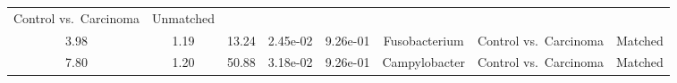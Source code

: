 \documentclass[12pt,]{article}
\begin{document}
\begin{longtable}[]{@{}cccccccc@{}}
\begin{minipage}[t]{0.14\columnwidth}
Control vs.~Carcinoma\strut
\end{minipage} & \begin{minipage}[t]{0.09\columnwidth}\centering\strut
Unmatched\strut
\end{minipage}\tabularnewline
\begin{minipage}[t]{0.05\columnwidth}\centering\strut
3.98\strut
\end{minipage} & \begin{minipage}[t]{0.09\columnwidth}\centering\strut
1.19\strut
\end{minipage} & \begin{minipage}[t]{0.09\columnwidth}\centering\strut
13.24\strut
\end{minipage} & \begin{minipage}[t]{0.07\columnwidth}\centering\strut
2.45e-02\strut
\end{minipage} & \begin{minipage}[t]{0.07\columnwidth}\centering\strut
9.26e-01\strut
\end{minipage} & \begin{minipage}[t]{0.20\columnwidth}\centering\strut
Fusobacterium\strut
\end{minipage} & \begin{minipage}[t]{0.14\columnwidth}\centering\strut
Control vs.~Carcinoma\strut
\end{minipage} & \begin{minipage}[t]{0.09\columnwidth}\centering\strut
Matched\strut
\end{minipage}\tabularnewline
\begin{minipage}[t]{0.05\columnwidth}\centering\strut
7.80\strut
\end{minipage} & \begin{minipage}[t]{0.09\columnwidth}\centering\strut
1.20\strut
\end{minipage} & \begin{minipage}[t]{0.09\columnwidth}\centering\strut
50.88\strut
\end{minipage} & \begin{minipage}[t]{0.07\columnwidth}\centering\strut
3.18e-02\strut
\end{minipage} & \begin{minipage}[t]{0.07\columnwidth}\centering\strut
9.26e-01\strut
\end{minipage} & \begin{minipage}[t]{0.20\columnwidth}\centering\strut
Campylobacter\strut
\end{minipage} & \begin{minipage}[t]{0.14\columnwidth}\centering\strut
Control vs.~Carcinoma\strut
\end{minipage} & \begin{minipage}[t]{0.09\columnwidth}\centering\strut
Matched\strut
\end{minipage}\tabularnewline
\bottomrule
\end{longtable}

\newpage
\end{document}

